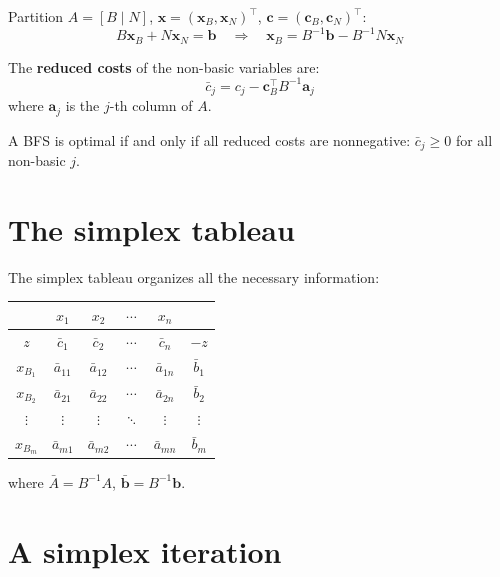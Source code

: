 Partition $A = [B \mid N]$, $\mathbf{x} = (\mathbf{x}_B, \mathbf{x}_N)^\top$,
$\mathbf{c} = (\mathbf{c}_B, \mathbf{c}_N)^\top$:
\[
  B\mathbf{x}_B + N\mathbf{x}_N = \mathbf{b}
  \quad \Rightarrow \quad
  \mathbf{x}_B = B^{-1}\mathbf{b} - B^{-1}N\mathbf{x}_N
\]

\begin{definition}
The \textbf{reduced costs} of the non-basic variables are:
\[
  \bar{c}_j = c_j - \mathbf{c}_B^\top B^{-1} \mathbf{a}_j
\]
where $\mathbf{a}_j$ is the $j$-th column of $A$.
\end{definition}

\begin{theorem}
\label{thm:simplex_optimality}
A BFS is optimal if and only if all reduced costs are nonnegative:
$\bar{c}_j \ge 0$ for all non-basic $j$.
\end{theorem}

\section{The simplex tableau}

The simplex tableau organizes all the necessary information:

\begin{center}
\begin{tabular}{c|cccc|c}
  & $x_1$ & $x_2$ & $\cdots$ & $x_n$ & \\
  \toprule
  $z$ & $\bar{c}_1$ & $\bar{c}_2$ & $\cdots$ & $\bar{c}_n$ & $-z$ \\
  \midrule
  $x_{B_1}$ & $\bar{a}_{11}$ & $\bar{a}_{12}$ & $\cdots$ & $\bar{a}_{1n}$ & $\bar{b}_1$ \\
  $x_{B_2}$ & $\bar{a}_{21}$ & $\bar{a}_{22}$ & $\cdots$ & $\bar{a}_{2n}$ & $\bar{b}_2$ \\
  $\vdots$ & $\vdots$ & $\vdots$ & $\ddots$ & $\vdots$ & $\vdots$ \\
  $x_{B_m}$ & $\bar{a}_{m1}$ & $\bar{a}_{m2}$ & $\cdots$ & $\bar{a}_{mn}$ & $\bar{b}_m$ \\
\end{tabular}
\end{center}

where $\bar{A} = B^{-1}A$, $\bar{\mathbf{b}} = B^{-1}\mathbf{b}$.

\section{A simplex iteration}

